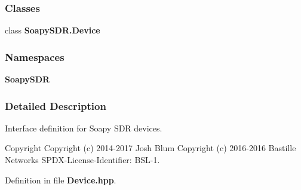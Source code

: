 \subsubsection*{Classes}
\begin{DoxyCompactItemize}
\item 
class {\bf Soapy\+S\+D\+R.\+Device}
\end{DoxyCompactItemize}
\subsubsection*{Namespaces}
\begin{DoxyCompactItemize}
\item 
 {\bf Soapy\+S\+DR}
\end{DoxyCompactItemize}


\subsubsection{Detailed Description}
Interface definition for Soapy S\+DR devices. 

\begin{DoxyCopyright}{Copyright}
Copyright (c) 2014-\/2017 Josh Blum Copyright (c) 2016-\/2016 Bastille Networks S\+P\+D\+X-\/\+License-\/\+Identifier\+: B\+S\+L-\/1. 
\end{DoxyCopyright}


Definition in file {\bf Device.\+hpp}.


